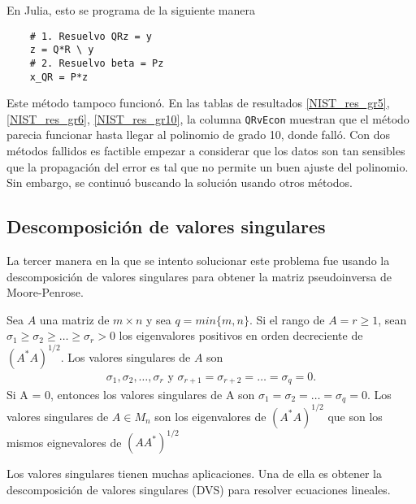 En Julia, esto se programa de la siguiente manera
\begin{verbatim}
    # 1. Resuelvo QRz = y
    z = Q*R \ y
    # 2. Resuelvo beta = Pz
    x_QR = P*z
\end{verbatim}


Este método tampoco funcionó. En las tablas de resultados \ref{NIST_res_gr5}, \ref{NIST_res_gr6}, \ref{NIST_res_gr10}, la columna \texttt{QRvEcon} muestran que el método parecia funcionar hasta llegar al polinomio de grado 10, donde falló.
Con dos métodos fallidos es factible empezar a considerar que los datos son tan sensibles que la propagación del error es tal que no permite un buen ajuste del polinomio. Sin embargo, se continuó buscando la solución usando otros métodos.

\subsection{Descomposición de valores singulares}

La tercer manera en la que se intento solucionar este problema fue usando la descomposición de valores singulares para obtener la matriz pseudoinversa de Moore-Penrose. 

\begin{definition}
Sea $A$ una matriz de $m \times n$ y sea $q = min \{m, n \}$. Si el rango de $A = r \geq 1$, sean $\sigma_1 \geq \sigma_2 \geq \dots \geq \sigma_r > 0$ los eigenvalores positivos en orden decreciente de $(A^{*}A)^{1/2}$. Los valores singulares de $A$ son
\begin{equation*}
    \begin{aligned}
    \sigma_1, \sigma_2, \dots, \sigma_r \text{ y } \sigma_{r+1} = \sigma_{r+2} = \dots = \sigma_q = 0.
    \end{aligned}
\end{equation*}
Si A = 0, entonces los valores singulares de A son $\sigma_1 = \sigma_2 = \dots = \sigma_q = 0$. 
Los valores singulares de $A \in M_{n}$ son los eigenvalores de $(A^{*}A)^{1/2}$ que son los mismos eignevalores de $(AA^{*})^{1/2}$
\cite[p.~420]{garcia2017second}
\end{definition}

Los valores singulares tienen muchas aplicaciones. Una de ella es obtener la descomposición de valores singulares (DVS) para resolver ecuaciones lineales. 


